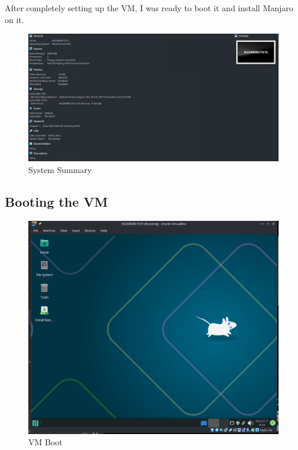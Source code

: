 \documentclass[a4paper,12pt]{report}
\begin{document}
\newpage
After completely setting up the VM, I was ready to boot it and install Manjaro on it.
\begin{figure}[h]
    \centering
    \includegraphics[width=1\linewidth]{sys_summary.png}
    \caption{System Summary}
    \label{fig8}
\end{figure}
\newpage

\subsection{Booting the VM}
\begin{figure}[h]
    \centering
    \includegraphics[width=0.5\linewidth]{vm_boot.png}
    \caption{VM Boot}
    \label{fig9}
\end{figure}
\end{document}
